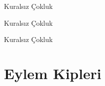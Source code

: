 \begin{kip}{}{Kuralsız Çokluk}
\end{kip}

\begin{kip}{}{Kuralsız Çokluk}
\end{kip}

\begin{kip}{}{Kuralsız Çokluk}
\end{kip}












\section{Eylem Kipleri}







